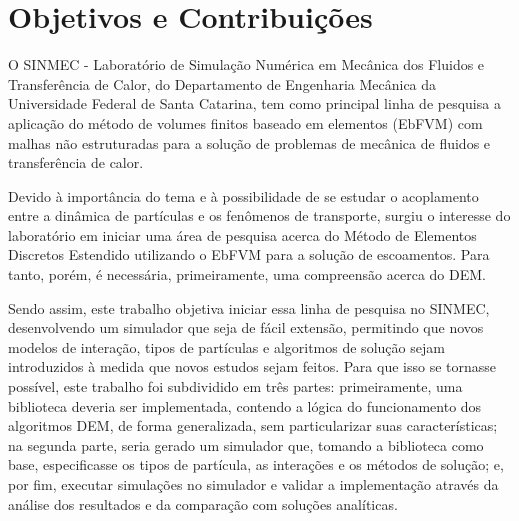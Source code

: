 \section{Objetivos e Contribuições}

O SINMEC - Laboratório de Simulação Numérica em Mecânica dos Fluidos e Transferência de Calor, do Departamento de Engenharia Mecânica da Universidade Federal de Santa Catarina, tem como principal linha de pesquisa a aplicação do método de volumes finitos baseado em elementos (EbFVM) com malhas não estruturadas para a solução de problemas de mecânica de fluidos e transferência de calor.

Devido à importância do tema e à possibilidade de se estudar o acoplamento entre a dinâmica de partículas e os fenômenos de transporte, surgiu o interesse do laboratório em iniciar uma área de pesquisa acerca do Método de Elementos Discretos Estendido utilizando o EbFVM para a solução de escoamentos. Para tanto, porém, é necessária, primeiramente, uma compreensão acerca do DEM.

Sendo assim, este trabalho objetiva iniciar essa linha de pesquisa no SINMEC, desenvolvendo um simulador que seja de fácil extensão, permitindo que novos modelos de interação, tipos de partículas e algoritmos de solução sejam introduzidos à medida que novos estudos sejam feitos. Para que isso se tornasse possível, este trabalho foi subdividido em três partes: primeiramente, uma biblioteca deveria ser implementada, contendo a lógica do funcionamento dos algoritmos DEM, de forma generalizada, sem particularizar suas características; na segunda parte, seria gerado um simulador que, tomando a biblioteca como base, especificasse os tipos de partícula, as interações e os métodos de solução; e, por fim, executar simulações no simulador e validar a implementação através da análise dos resultados e da comparação com soluções analíticas. 
 
